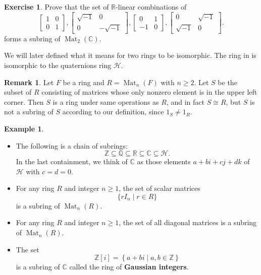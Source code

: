 \documentclass[12pt]{report}
\numberwithin{equation}{section}
\numberwithin{theorem}{chapter}
\theoremstyle{definition}
\newtheorem{example}[theorem]{Example}
\newtheorem{exercise}{Exercise}
\newtheorem*{basic properties}{Basic Properties}
\newtheorem*{Important Remark}{Important Remark}
\newtheorem{remark}[theorem]{Remark}
\newcommand{\df}[1]{{\bf #1}\index{#1}}
\newcommand{\C}{\mathbb{C}}
\DeclareMathOperator{\Mat}{Mat}
\begin{document}
\begin{exercise}\label{exercise quaternions ring}
Prove that the set of $\mathbb{R}$-linear combinations of 
$$\begin{bmatrix}
1 & 0 \\ 0 & 1
\end{bmatrix},
\begin{bmatrix}
\sqrt{-1} & 0 \\ 0 & -\sqrt{-1} 
\end{bmatrix},
\begin{bmatrix}
0 & 1 \\ -1 & 0 
\end{bmatrix},
\begin{bmatrix}
0 & \sqrt{-1} \\ \sqrt{-1} & 0 
\end{bmatrix}.$$
forms a subring of $\Mat_{2}(\C)$. 
\end{exercise}

We will later defined what it means for two rings to be isomorphic. The ring in  is isomorphic to the quaternions ring $\mathcal{H}$. 


\begin{remark}
Let $F$ be a ring and $R = \Mat_{n}(F)$ with $n \geqslant 2$. Let $S$ be the subset of $R$ consisting of matrices whose only nonzero element is in the upper left corner. Then $S$ is a ring under same operations as $R$, and in fact $S \cong R$, but $S$ is not a subring of $S$ according to our definition, since $1_S \neq 1_R$.
\end{remark}



\begin{example}
\begin{itemize}[itemsep=0.1em]
\item The following is a chain of subrings:
$$\mathbb{Z} \subseteq \mathbb{Q} \subseteq \mathbb{R} \subseteq \C \subseteq \mathcal{H}.$$
In the last containment, we think of $\C$ as those elements $a + bi + cj + dk$ of
  $\mathcal{H}$ with $c=d=0$.
\item For any ring $R$ and integer $n \geqslant 1$, the set of scalar matrices
$$\{ rI_n \mid r \in R \}$$ 
is a subring of $\Mat_{n}(R)$.
 \item For any ring $R$ and integer $n \geqslant 1$, the set of all diagonal matrices is a subring of $\Mat_{n}(R)$. 
\item The set 
$$\mathbb{Z}[i]=\left \{ a+bi\mid a,b \in \mathbb{Z} \right\}$$ 
is a subring of $\C$ called the ring of \df{Gaussian integers}.
\end{itemize}
\end{example}
\end{document}
